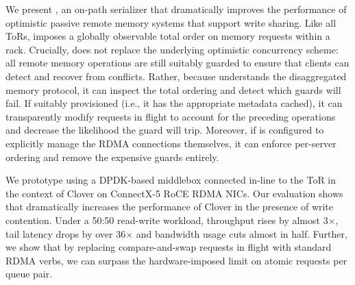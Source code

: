 We present {\sword}, an on-path serializer
that dramatically improves the performance of optimistic passive
remote memory systems that support write sharing.  Like all ToRs,
{\sword} imposes a globally observable total order on memory
requests within a rack.  Crucially, {\sword} does not replace the
underlying optimistic concurrency scheme: all remote memory operations
are still suitably guarded to ensure that clients can detect and
recover from conflicts.  Rather, because {\sword} understands the
disaggregated memory protocol, it can inspect the total ordering and
detect which guards will fail.  If suitably provisioned (i.e., it has
the appropriate metadata cached), it can transparently modify requests
in flight to account for the preceding operations and decrease the
likelihood the guard will trip.  Moreover, if {\sword} is configured
to explicitly manage the RDMA connections themselves, it can enforce
per-server ordering and remove the expensive guards entirely.

We prototype {\sword} using a DPDK-based middlebox connected in-line
to the ToR in the context of Clover on ConnectX-5 RoCE RDMA NICs.  Our
evaluation shows that {\sword} dramatically increases the performance
of Clover in the presence of write contention.  Under a 50:50
read-write workload, throughput rises by almost 3$\times$, tail
latency drops by over 36$\times$ and bandwidth usage cuts almost in
half.  Further, we show that by replacing compare-and-swap requests
in flight with standard RDMA verbs, we can surpass the
hardware-imposed limit on atomic requests per queue pair.

